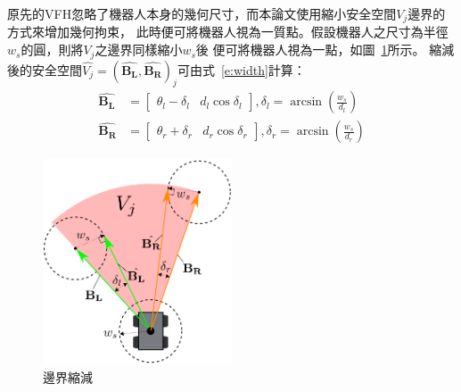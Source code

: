 原先的VFH忽略了機器人本身的幾何尺寸，而本論文使用縮小安全空間$V_j$邊界的方式來增加幾何拘束，
此時便可將機器人視為一質點。假設機器人之尺寸為半徑$w_s$的圓，則將$V_j$之邊界同樣縮小$w_s$後
便可將機器人視為一點，如圖~\ref{f:width}所示。
縮減後的安全空間$\hat{V_j} = (\hat{\mathbf{B_L}},\hat{\mathbf{B_R}})_j$可由式~\ref{e:width}計算：
\begin{align}
	\hat{\mathbf{B_L}}	&= \begin{bmatrix}
					\theta_l - \delta_l & d_l\cos\delta_l
				   \end{bmatrix},\delta_l = \arcsin({\frac{w_s}{d_l}}) \nonumber \\
	\hat{\mathbf{B_R}}	&= \begin{bmatrix}
					\theta_r + \delta_r & d_r\cos\delta_r
				   \end{bmatrix},\delta_r = \arcsin({\frac{w_s}{d_r}})
	\label{e:width}
\end{align}
\begin{figure}[h!]
	\centering
	\includegraphics[width=0.5\textwidth]{figures/algorithm/width}
	\caption{邊界縮減}
	\label{f:width}
\end{figure}

